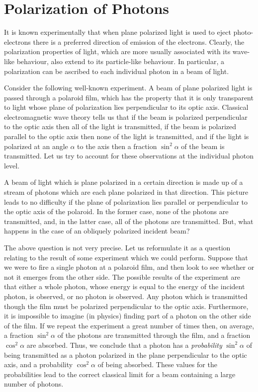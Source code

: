 \section{Polarization of Photons}
It is known experimentally that when plane polarized light is used to
eject photo-electrons there is a preferred direction of emission of
the electrons. Clearly, the polarization properties of light, which are more usually
associated with its wave-like behaviour, also extend to its  particle-like
behaviour. In particular, a polarization can be ascribed to each 
individual photon in a
beam of light. 

Consider the following well-known experiment. A beam of plane polarized
light is passed through a polaroid film, which
has the property that it is only transparent to
light whose plane of polarization lies perpendicular to its optic axis.
  Classical electromagnetic wave theory tells us that
if the beam is polarized perpendicular to the optic axis then all of the light
is transmitted, if the beam is polarized parallel to the optic axis
then none of the light is transmitted, and if the light is
polarized at an angle $\alpha$ to the  axis then  a fraction $\sin^2\alpha$
of the beam is transmitted. Let us try to account for these observations
at the individual photon level.  

A beam of light which is plane polarized in a certain direction is
made up of a stream of photons which are each plane polarized in that direction.
This picture leads to no difficulty if the plane of polarization lies parallel
or perpendicular to the optic axis of the polaroid. In the former case, none of the
photons are transmitted, and, in the latter case, all of the photons are transmitted.
But, what happens in the case of an obliquely polarized incident beam?

The above question is not very precise. Let us reformulate it as a question
relating to the result of some experiment which we could perform. 
Suppose that we were to fire a single photon at a polaroid film, and then look
to see whether or not it emerges from the other side. The possible
results of the experiment are that either a whole photon, whose energy
is equal to the energy of the incident photon, is observed, or no photon
is observed. Any photon which is transmitted though the film must 
be polarized perpendicular to the optic axis. Furthermore, it is impossible to
imagine (in physics) finding part of a photon on the other side of the film.
If we repeat the experiment a great number of times then, on average,
a fraction $\sin^2\alpha$ of the photons are transmitted through the film, and
a fraction $\cos^2\alpha$ are absorbed. Thus, we conclude that a photon has a {\em probability}
$\sin^2\alpha$ of being transmitted as a photon polarized in the plane
perpendicular to the optic axis, and a probability $\cos^2\alpha$ of
being absorbed. These values for the probabilities lead to the correct classical
limit for a beam containing a large number of photons. 

